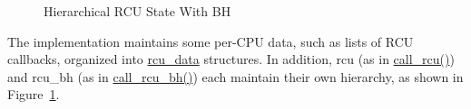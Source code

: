 \begin{figure}[htb]
\begin{center}
\end{center}
\caption{Hierarchical RCU State With BH}
\label{fig:app:rcuimpl:rcutree:Hierarchical RCU State With BH}
\end{figure}

The implementation maintains some per-CPU data, such as lists of
RCU callbacks, organized into \url{rcu_data} structures.
In addition, rcu (as in \url{call_rcu()}) and
rcu\_bh (as in \url{call_rcu_bh()}) each maintain their own
hierarchy, as shown in
Figure~\ref{fig:app:rcuimpl:rcutree:Hierarchical RCU State With BH}.

 \QuickQuizEnd

